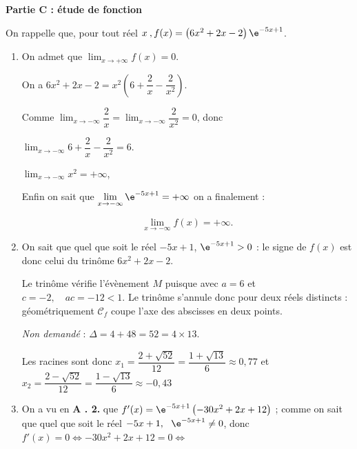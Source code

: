 \medskip

\textbf{Partie C : étude de fonction}

\medskip


On rappelle que, pour tout réel $x\:, f(x) = \left(6x^2 + 2x - 2\right)\e^{-5x+ 1}$.


\medskip

\begin{enumerate}
\item On admet que $\displaystyle\lim_{x \to + \infty} f(x) = 0$.

On a $6x^2 + 2x - 2 = x^2\left(6 + \dfrac{2}{x} - \dfrac{2}{x^2} \right)$.

Comme $\displaystyle\lim_{x \to - \infty} \dfrac{2}{x} = \displaystyle\lim_{x \to - \infty}\dfrac{2}{x^2} = 0$, donc 

$\displaystyle\lim_{x \to - \infty}6 + \dfrac{2}{x} - \dfrac{2}{x^2} = 6$.

$\displaystyle\lim_{x \to - \infty} x^2 = + \infty$, 

Enfin on sait que $\displaystyle\lim_{x \to - \infty}\e^{-5x+ 1} = + \infty$ on a finalement :

\[\displaystyle\lim_{x \to - \infty}f(x) = + \infty.\]
\item %
On sait que quel que soit le réel $- 5x + 1$, \: \: $\e^{- 5x + 1} > 0$ : le signe de $f(x)$ est donc celui du trinôme $6x^2 + 2x - 2$.

Le trinôme vérifie l'évènement $M$ puisque avec $a = 6$ et $c = - 2, \quad ac= - 12 < 1$.
Le trinôme s'annule donc pour deux réels distincts : géométriquement $\mathcal{C}_f$ coupe l'axe des abscisses en deux points.

\emph{Non demandé} : $\Delta = 4 + 48 = 52 = 4 \times 13$.

Les racines sont donc $x_1 = \dfrac{2+ \sqrt{52}}{12} = \dfrac{1 + \sqrt{13}}{6} \approx 0,77$ et $x_2 = \dfrac{2 - \sqrt{52}}{12} = \dfrac{1 - \sqrt{13}}{6} \approx - 0,43$
\item %
On a vu en \textbf{A . 2.} que $f'(x) = \e^{-5x+ 1}\left(-30x^2 + 2x + 12\right)$ ; comme on sait que quel que soit le réel $-5x + 1,\:\: \: \e^{-5x+ 1} \ne 0$, donc $f'(x) = 0 \iff -30x^2 + 2x + 12 = 0 \iff$


\end{enumerate}
